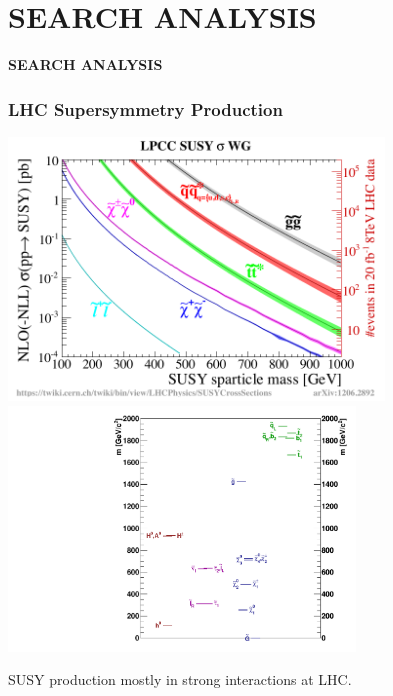 \documentclass{beamer}
\begin{document}
\section{SEARCH ANALYSIS}
{
\begin{frame}
   \begin{center}
    \textcolor{UMN@Maroon}{\Huge{\textbf{SEARCH ANALYSIS}} }
   \end{center}
\end{frame}
}
\begin{frame}
\frametitle{LHC Supersymmetry Production}
 \begin{minipage}[t]{0.5\linewidth}
   \includegraphics[height=7cm,width=0.45\paperwidth]{THESISPLOTS/SUSY-XSEC.pdf}
   \includegraphics[height=6.5cm,width=0.40\paperwidth]{THESISPLOTS/gmsb_Lambda180_CTau10000.pdf}
 \end{minipage} 
   
 \begin{minipage}[b]{\linewidth}
   SUSY production mostly in strong interactions at LHC.
 \end{minipage}
\end{frame}
\end{document}
